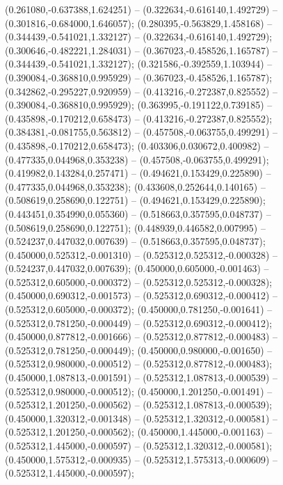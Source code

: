  (0.261080,-0.637388,1.624251) -- (0.322634,-0.616140,1.492729) -- (0.301816,-0.684000,1.646057);
 (0.280395,-0.563829,1.458168) -- (0.344439,-0.541021,1.332127) -- (0.322634,-0.616140,1.492729);
 (0.300646,-0.482221,1.284031) -- (0.367023,-0.458526,1.165787) -- (0.344439,-0.541021,1.332127);
 (0.321586,-0.392559,1.103944) -- (0.390084,-0.368810,0.995929) -- (0.367023,-0.458526,1.165787);
 (0.342862,-0.295227,0.920959) -- (0.413216,-0.272387,0.825552) -- (0.390084,-0.368810,0.995929);
 (0.363995,-0.191122,0.739185) -- (0.435898,-0.170212,0.658473) -- (0.413216,-0.272387,0.825552);
 (0.384381,-0.081755,0.563812) -- (0.457508,-0.063755,0.499291) -- (0.435898,-0.170212,0.658473);
 (0.403306,0.030672,0.400982) -- (0.477335,0.044968,0.353238) -- (0.457508,-0.063755,0.499291);
 (0.419982,0.143284,0.257471) -- (0.494621,0.153429,0.225890) -- (0.477335,0.044968,0.353238);
 (0.433608,0.252644,0.140165) -- (0.508619,0.258690,0.122751) -- (0.494621,0.153429,0.225890);
 (0.443451,0.354990,0.055360) -- (0.518663,0.357595,0.048737) -- (0.508619,0.258690,0.122751);
 (0.448939,0.446582,0.007995) -- (0.524237,0.447032,0.007639) -- (0.518663,0.357595,0.048737);
 (0.450000,0.525312,-0.001310) -- (0.525312,0.525312,-0.000328) -- (0.524237,0.447032,0.007639);
 (0.450000,0.605000,-0.001463) -- (0.525312,0.605000,-0.000372) -- (0.525312,0.525312,-0.000328);
 (0.450000,0.690312,-0.001573) -- (0.525312,0.690312,-0.000412) -- (0.525312,0.605000,-0.000372);
 (0.450000,0.781250,-0.001641) -- (0.525312,0.781250,-0.000449) -- (0.525312,0.690312,-0.000412);
 (0.450000,0.877812,-0.001666) -- (0.525312,0.877812,-0.000483) -- (0.525312,0.781250,-0.000449);
 (0.450000,0.980000,-0.001650) -- (0.525312,0.980000,-0.000512) -- (0.525312,0.877812,-0.000483);
 (0.450000,1.087813,-0.001591) -- (0.525312,1.087813,-0.000539) -- (0.525312,0.980000,-0.000512);
 (0.450000,1.201250,-0.001491) -- (0.525312,1.201250,-0.000562) -- (0.525312,1.087813,-0.000539);
 (0.450000,1.320312,-0.001348) -- (0.525312,1.320312,-0.000581) -- (0.525312,1.201250,-0.000562);
 (0.450000,1.445000,-0.001163) -- (0.525312,1.445000,-0.000597) -- (0.525312,1.320312,-0.000581);
 (0.450000,1.575312,-0.000935) -- (0.525312,1.575313,-0.000609) -- (0.525312,1.445000,-0.000597);
